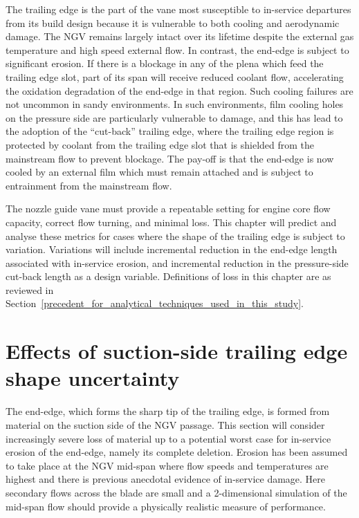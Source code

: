 \documentclass[a4paper, 11pt, oneside]{report}
\begin{document}
The trailing edge is the part of the vane most susceptible to in-service departures from its build design because it is vulnerable to both cooling and aerodynamic damage. The NGV remains largely intact over its lifetime despite the external gas temperature and high speed external flow. In contrast, the end-edge is subject to significant erosion. If there is a blockage in any of the plena which feed the trailing edge slot, part of its span will receive reduced coolant flow, accelerating the oxidation degradation of the end-edge in that region. Such cooling failures are not uncommon in sandy environments. In such environments, film cooling holes on the pressure side are particularly vulnerable to damage, and this has lead to the adoption of the ``cut-back'' trailing edge, where the trailing edge region is protected by coolant from the trailing edge slot that is shielded from the mainstream flow to prevent blockage. The pay-off is that the end-edge is now cooled by an external film which must remain attached and is subject to entrainment from the mainstream flow.

The nozzle guide vane must provide a repeatable setting for engine core flow capacity, correct flow turning, and minimal loss. This chapter will predict and analyse these metrics for cases where the shape of the trailing edge is subject to variation. Variations will include incremental reduction in the end-edge length associated with in-service erosion, and incremental reduction in the pressure-side cut-back length as a design variable. Definitions of loss in this chapter are as reviewed in Section~\ref{precedent_for_analytical_techniques_used_in_this_study}.


\section{Effects of suction-side trailing edge shape uncertainty}
\label{suction_side_cutbacks}

The end-edge, which forms the sharp tip of the trailing edge, is formed from material on the suction side of the NGV passage. This section will consider increasingly severe loss of material up to a potential worst case for in-service erosion of the end-edge, namely its complete deletion. Erosion has been assumed to take place at the NGV mid-span where flow speeds and temperatures are highest and there is previous anecdotal evidence of in-service damage. Here secondary flows across the blade are small and a 2-dimensional simulation of the mid-span flow should provide a physically realistic measure of performance.
\end{document}
